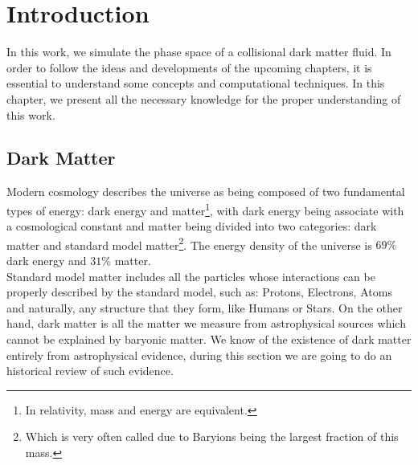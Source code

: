 \chapter{Introduction}
In this work, we simulate the phase space of a collisional dark matter fluid.
In order to follow the ideas and developments of the upcoming chapters, it is essential to understand some concepts and computational techniques.
In this chapter, we present all the necessary knowledge for the proper understanding of this work.
\section{Dark Matter}
Modern cosmology describes the universe as being composed of two fundamental types of energy: dark energy and matter\footnote{In relativity, mass and energy are equivalent.}, with dark energy being associate with a cosmological constant and matter being divided into two categories: dark matter and standard model matter\footnote{Which is very often called  due to Baryions being the largest fraction of this mass.}.
The energy density of the universe is $69\%$ dark energy and $31\%$ matter.\\


Standard model matter includes all the particles whose interactions can be properly described by the standard model, such as: Protons, Electrons, Atoms and naturally, any structure that they form, like Humans or Stars.
On the other hand, dark matter is all the matter we measure from astrophysical sources which cannot be explained by baryonic matter.
We know of the existence of dark matter entirely from astrophysical evidence, during this section we are going to do an historical review of such evidence.\\

